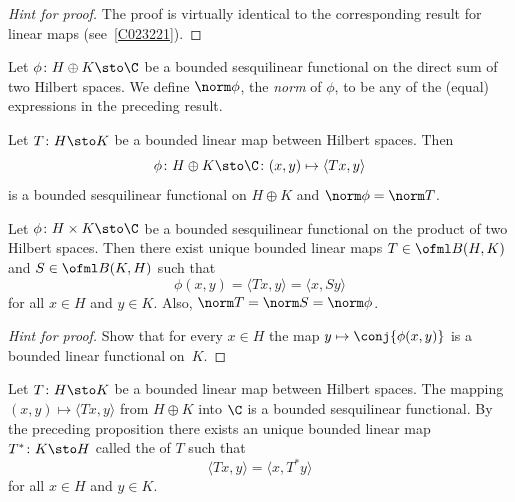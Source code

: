 \begin{proof}[\emph{Hint for proof}] The proof is virtually identical to the corresponding
result for linear maps (see~\ref{C023221}). \ns
\end{proof}

\begin{defn} Let $\phi \colon H \oplus K \sto \C$ be a bounded sesquilinear functional on
the direct sum of two Hilbert spaces. We define $\norm \phi$, the
\emph{norm} of $\phi$, to be any of the (equal) expressions in the preceding result.
\end{defn}

\begin{prop} Let $T\colon H \sto K$ be a bounded linear map between Hilbert spaces.  Then
   \[ \phi \colon H \oplus K \sto \C\colon (x,y) \mapsto \langle Tx,y \rangle \]
is a bounded sesquilinear functional on $H \oplus K$ and $\norm\phi = \norm T$.
\end{prop}

\begin{prop} Let $\phi \colon H \times K \sto \C$ be a bounded sesquilinear functional on the
product of two Hilbert spaces. Then there exist unique bounded linear maps $T \in \ofml B(H,K)$ and
$S \in \ofml B(K,H)$ such that
    \[ \phi(x,y) = \langle Tx,y \rangle = \langle x,Sy \rangle \]
for all $x \in H$ and $y \in K$. Also, $\norm T = \norm S = \norm\phi$.
\end{prop}

\begin{proof}[\emph{Hint for proof}] Show that for every $x \in H$ the map
$y \mapsto \conj{\phi(x,y)}$ is a bounded linear functional on~$K$. \ns
\end{proof}

\begin{defn}\label{def000926} Let $T\colon H \sto K$ be a bounded linear map between Hilbert spaces.  The
mapping $(x,y) \mapsto \langle Tx,y \rangle$ from $H \oplus K$ into $\C$ is a bounded
sesquilinear functional. By the preceding proposition there exists an unique bounded
linear
map $T^*\colon K \sto H$ called the  of $T$ such that
   \[ \langle Tx,y \rangle = \langle x,T^*y \rangle \]
for all $x \in H$ and $y \in K$.
\end{defn}

